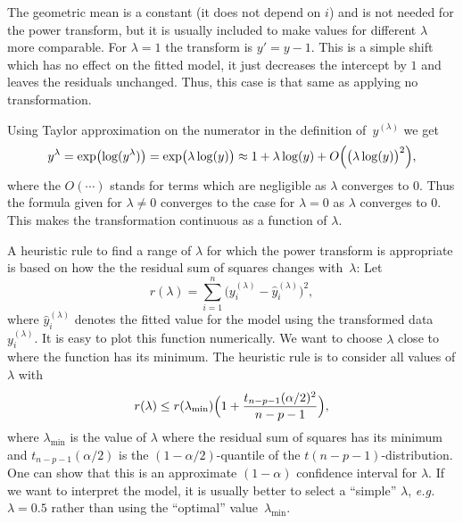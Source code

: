 \documentclass[
  a4paper,
]{article}
\theoremstyle{definition}
\theoremstyle{definition}
\theoremstyle{definition}
\theoremstyle{definition}
\theoremstyle{remark}
\begin{document}
The geometric mean is a constant (it does not depend on \(i\)) and is not needed
for the power transform, but it is usually included to make values for
different \(\lambda\) more comparable. For \(\lambda = 1\) the transform is \(y' = y - 1\). This is a simple shift which has no effect on the fitted model, it just
decreases the intercept by \(1\) and leaves the residuals unchanged. Thus, this
case is that same as applying no transformation.

Using Taylor approximation on the numerator in the definition
of~\(y^{(\lambda)}\) we get
\begin{equation*}
  y^\lambda
  = \exp\bigl( \log(y^\lambda) \bigr)
  = \exp\bigl( \lambda \log(y) \bigr)
  \approx 1 + \lambda\log(y) + O\Bigl(\bigl(\lambda\log(y)\bigr)^2\Bigr),
\end{equation*}
where the \(O(\cdots)\) stands for terms which are negligible as
\(\lambda\) converges to \(0\). Thus the formula given for \(\lambda \neq 0\)
converges to the case for \(\lambda = 0\) as \(\lambda\) converges to \(0\).
This makes the transformation continuous as a function of \(\lambda\).

A heuristic rule to find a range of \(\lambda\) for which the power
transform is appropriate is based on how the the residual sum of
squares changes with~\(\lambda\): Let
\begin{equation*}
  r(\lambda)
  = \sum_{i=1}^n \bigl( y^{(\lambda)}_i - \hat y^{(\lambda)}_i \bigr)^2,
\end{equation*}
where \(\hat y^{(\lambda)}_i\) denotes the fitted value for the model
using the transformed data \(y^{(\lambda)}_i\). It is easy to plot
this function numerically. We want to choose \(\lambda\) close to
where the function has its minimum. The heuristic rule is to consider
all values of \(\lambda\) with
\begin{equation}
  r(\lambda)
  \leq r(\lambda_\mathrm{min}) \Bigl( 1 + \frac{t_{n-p-1}(\alpha/2)^2}{n-p-1} \Bigr),
      \label{eq:power-cutoff}
\end{equation}
where \(\lambda_\mathrm{min}\) is the value of \(\lambda\) where the residual
sum of squares has its minimum and \(t_{n-p-1}(\alpha/2)\) is the
\((1-\alpha/2)\)-quantile of the \(t(n-p-1)\)-distribution. One can show that this
is an approximate \((1-\alpha)\) confidence interval for \(\lambda\). If we want to
interpret the model, it is usually better to select a ``simple'' \(\lambda\),
\emph{e.g.}~\(\lambda=0.5\) rather than using the
``optimal'' value~\(\lambda_\mathrm{min}\).
\end{document}

